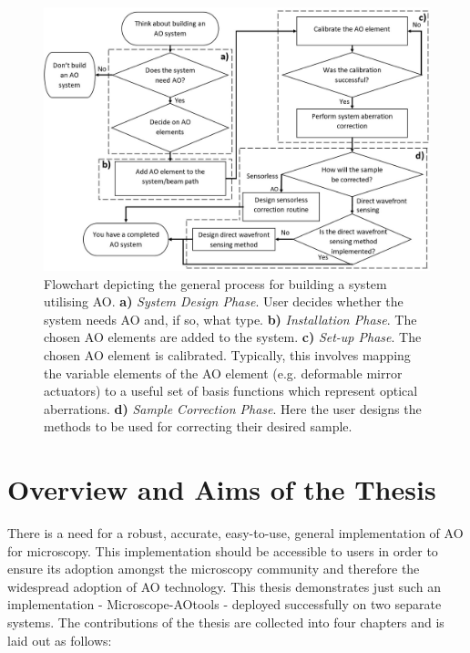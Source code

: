 \begin{figure}[h]
	\centering
	\includegraphics[width=1\textwidth, scale=0.5]{./images/ao_system_setup_workflow_new.jpg}
	\caption[Flowchart depicting the general process for building a system utilising AO.]{Flowchart depicting the general process for building a system utilising AO. \textbf{a)} \textit{System Design Phase}. User decides whether the system needs AO and, if so, what type. \textbf{b)} \textit{Installation Phase}. The chosen AO elements are added to the system. \textbf{c)} \textit{Set-up Phase}. The chosen AO element is calibrated. Typically, this involves mapping the variable elements of the AO element (e.g. deformable mirror actuators) to a useful set of basis functions which represent optical aberrations. \textbf{d)} \textit{Sample Correction Phase}. Here the user designs the methods to be used for correcting their desired sample.}
	\label{fig:ao_system_setup_workflow}
\end{figure}

\section{Overview and Aims of the Thesis}
\label{sec:overview}

There is a need for a robust, accurate, easy-to-use, general implementation 
of AO for microscopy\cite{ji2017adaptive,rodriguez2018adaptive}.
This implementation should be accessible to users in order to ensure its
adoption amongst the microscopy community and therefore the widespread 
adoption of AO technology. This thesis demonstrates just such an 
implementation - Microscope-AOtools - deployed successfully on two separate 
systems. The contributions of the thesis are collected into four chapters 
and is laid out as follows:

